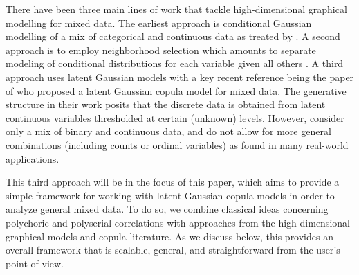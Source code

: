 There have been three main lines of work that tackle high-dimensional graphical modelling for mixed data. The earliest approach is conditional Gaussian modelling of a mix of categorical and continuous data \citep{Lauritzen96} as treated by \citet{Cheng17, Lee15}. A second approach is to employ neighborhood selection which amounts to separate modeling of conditional distributions for each variable given all others \citep[see e.g.][]{Chen15,Yang14, Yang19}. A third approach uses latent Gaussian models with a key recent reference being the paper of \citet{Fan17} who proposed a latent Gaussian copula model for mixed data.  The generative structure in their work posits that the discrete data is obtained from latent continuous variables thresholded at certain (unknown) levels.  However, \citet{Fan17} consider only a mix of binary and continuous data, and do not allow for more general combinations (including counts or ordinal variables) as found in many real-world applications. 


This third approach will be in the focus of this paper, which aims to provide a simple framework for working with latent Gaussian copula models in order to analyze general mixed data.
To do so, we combine classical ideas concerning polychoric and polyserial correlations with approaches from the high-dimensional graphical models and copula literature. As we discuss below, this provides an overall framework that is scalable, general, and straightforward from the user's point of view.

